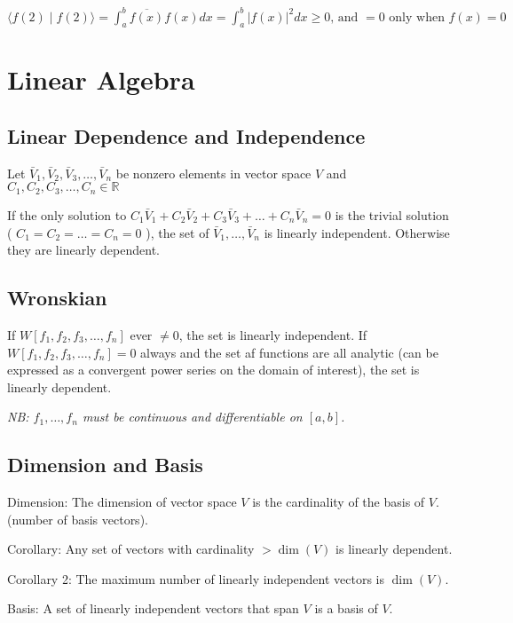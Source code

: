 \documentclass{report}
\begin{document}
$\langle f(2) \mid f(2)\rangle=\displaystyle\int_{a}^{b} \overline{f(x)} f(x) d x=\displaystyle\int_{a}^{b}|f(x)|^{2} d x \geqslant 0 \text {, and }=0 \text { only when } f(x)=0$

\chapter{Linear Algebra}

\section{Linear Dependence and Independence}

Let $\bar{V}_1, \bar{V}_2, \bar{V}_3, \ldots, \bar{V}_n$ be nonzero elements in vector space $V$ and $C_1, C_2, C_3, \ldots, C_n \in \mathbb{R}$

If the only solution to $C_1 \bar{V}_1+C_2 \bar{V}_2+C_3 \bar{V}_3+\ldots+ C_n \bar{V}_n=0$ is the trivial solution ( $C_1=C_2=\ldots=C_n=0$ ), the set of $\bar{V}_1, \ldots, \bar{V}_n$ is linearly independent. Otherwise they are linearly dependent.

\section{Wronskian}

If $W\left[f_1, f_2, f_3, \ldots, f_n\right]$ ever $\neq 0$, the set is linearly independent. If $W\left[f_1, f_2, f_3, \ldots, f_n\right]=0$ always and the set af functions are all analytic (can be expressed as a convergent power series on the domain of interest), the set is linearly dependent.

\emph{NB: $f_1, \ldots, f_n$ must be continuous and differentiable on $[a, b]$.}

\section{Dimension and Basis}

Dimension: The dimension of vector space $V$ is the cardinality of the basis of $V$. (number of basis vectors).

Corollary: Any set of vectors with cardinality $>\operatorname{dim}(V)$ is linearly dependent.

Corollary 2: The maximum number of linearly independent vectors is $\operatorname{dim}(V)$.

Basis: A set of linearly independent vectors that span $V$ is a basis of $V$. 
\end{document}
